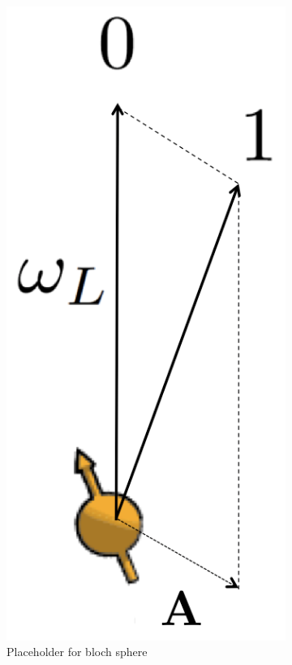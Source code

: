 \begin{figure}[htbp]
\begin{subfigure}[t]{0.32\textwidth}
        \includegraphics[scale=0.2]{Img/QuantizationAxis.png}
        \caption{Placeholder for bloch sphere }
    \end{subfigure}
    \begin{subfigure}[t]{0.32\textwidth}\centering

\end{subfigure}
\end{figure}
